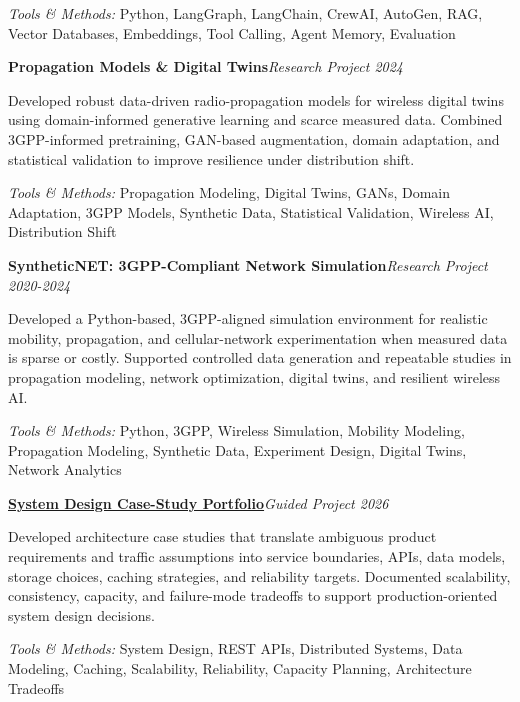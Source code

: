 \documentclass[9pt,letterpaper]{extarticle}
\newcommand{\entry}[2]{\Needspace{4\baselineskip}\textbf{#1}\hfill\textit{#2}\par}
\begin{document}
{\small\textit{Tools \& Methods:} Python, LangGraph, LangChain, CrewAI, AutoGen, RAG, Vector Databases, Embeddings, Tool Calling, Agent Memory, Evaluation\par}
\vspace{1pt}
\entry{Propagation Models \& Digital Twins}{Research Project \textbar{} 2024}
Developed robust data-driven radio-propagation models for wireless digital twins using domain-informed generative learning and scarce measured data. Combined 3GPP-informed pretraining, GAN-based augmentation, domain adaptation, and statistical validation to improve resilience under distribution shift.\par
{\small\textit{Tools \& Methods:} Propagation Modeling, Digital Twins, GANs, Domain Adaptation, 3GPP Models, Synthetic Data, Statistical Validation, Wireless AI, Distribution Shift\par}
\vspace{1pt}
\entry{SyntheticNET: 3GPP-Compliant Network Simulation}{Research Project \textbar{} 2020-2024}
Developed a Python-based, 3GPP-aligned simulation environment for realistic mobility, propagation, and cellular-network experimentation when measured data is sparse or costly. Supported controlled data generation and repeatable studies in propagation modeling, network optimization, digital twins, and resilient wireless AI.\par
{\small\textit{Tools \& Methods:} Python, 3GPP, Wireless Simulation, Mobility Modeling, Propagation Modeling, Synthetic Data, Experiment Design, Digital Twins, Network Analytics\par}
\vspace{1pt}
\entry{\href{https://github.com/WaseemRaza844/system-design-masterclass}{System Design Case-Study Portfolio}}{Guided Project \textbar{} 2026}
Developed architecture case studies that translate ambiguous product requirements and traffic assumptions into service boundaries, APIs, data models, storage choices, caching strategies, and reliability targets. Documented scalability, consistency, capacity, and failure-mode tradeoffs to support production-oriented system design decisions.\par
{\small\textit{Tools \& Methods:} System Design, REST APIs, Distributed Systems, Data Modeling, Caching, Scalability, Reliability, Capacity Planning, Architecture Tradeoffs\par}
\vspace{1pt}
\end{document}
